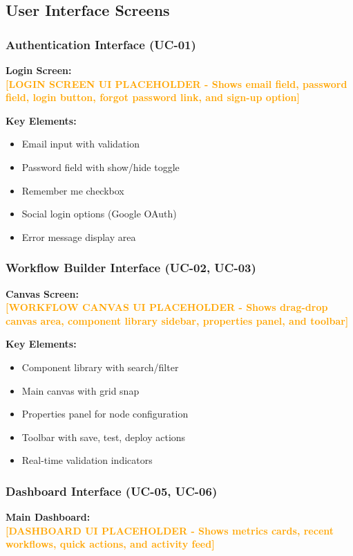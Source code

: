 \documentclass[12pt,a4paper]{article}
\begin{document}
\subsection{User Interface Screens}

\subsubsection{Authentication Interface (UC-01)}
\textbf{Login Screen:}\\
\textcolor{orange}{\textbf{[LOGIN SCREEN UI PLACEHOLDER - Shows email field, password field, login button, forgot password link, and sign-up option]}}

\textbf{Key Elements:}
\begin{itemize}
    \item Email input with validation
    \item Password field with show/hide toggle
    \item Remember me checkbox
    \item Social login options (Google OAuth)
    \item Error message display area
\end{itemize}

\subsubsection{Workflow Builder Interface (UC-02, UC-03)}
\textbf{Canvas Screen:}\\
\textcolor{orange}{\textbf{[WORKFLOW CANVAS UI PLACEHOLDER - Shows drag-drop canvas area, component library sidebar, properties panel, and toolbar]}}

\textbf{Key Elements:}
\begin{itemize}
    \item Component library with search/filter
    \item Main canvas with grid snap
    \item Properties panel for node configuration
    \item Toolbar with save, test, deploy actions
    \item Real-time validation indicators
\end{itemize}

\subsubsection{Dashboard Interface (UC-05, UC-06)}
\textbf{Main Dashboard:}\\
\textcolor{orange}{\textbf{[DASHBOARD UI PLACEHOLDER - Shows metrics cards, recent workflows, quick actions, and activity feed]}}
\end{document}
